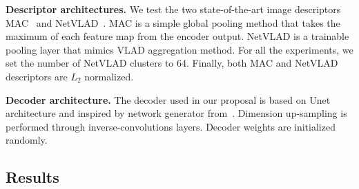 \vspace{4pt}\noindent\textbf{Descriptor architectures.} We test the two state-of-the-art image descriptors MAC~\cite{Radenovic2017} and NetVLAD~\cite{Arandjelovic2017}. MAC is a simple global pooling method that takes the maximum of each feature map from the encoder output. NetVLAD is a trainable pooling layer that mimics VLAD aggregation method. For all the experiments, we set the number of NetVLAD clusters to 64. Finally, both MAC and NetVLAD descriptors are $L_{2}$ normalized.

\vspace{4pt}\noindent\textbf{Decoder architecture.} The decoder used in our proposal is based on Unet architecture and inspired by network generator from~\cite{Isola2017}. Dimension up-sampling is performed through inverse-convolutions layers. Decoder weights are initialized randomly.

\subsection{Results}
\label{subsec:results}

